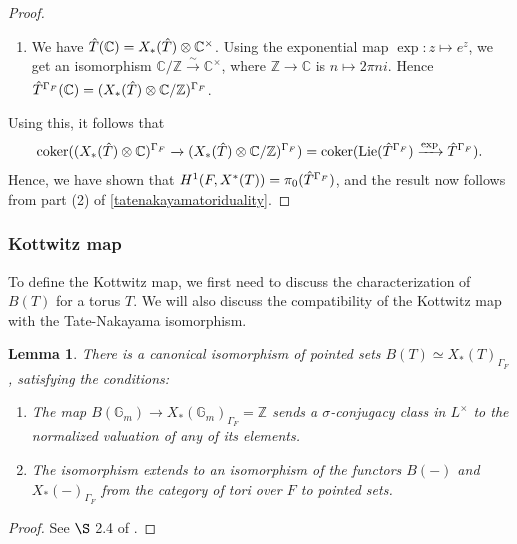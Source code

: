 \documentclass[11pt,a4paper]{article}
\theoremstyle{definition}
\theoremstyle{plain}
\newtheorem{Le}[shared]{Lemma}
\theoremstyle{remark}
\theoremstyle{plain}
\DeclareMathOperator{\Lie}{Lie}
\DeclareMathOperator{\coker}{coker}
\begin{document}
\begin{proof}
\begin{enumerate}
    \item We have $\Hat{T}(\mathbb{C}) = X_*(\Hat{T}) \otimes \mathbb{C}^{\times}$. Using the exponential map $\exp: z \mapsto e^z$, we get an isomorphism $\mathbb{C}/\mathbb{Z} \xrightarrow[]{\sim} \mathbb{C}^{\times}$, where $\mathbb{Z} \xrightarrow[]{} \mathbb{C}$ is $n \mapsto 2\pi ni$. Hence $\Hat{T}^{\Gamma_F}(\mathbb{C}) = (X_*(\Hat{T}) \otimes \mathbb{C}/\mathbb{Z})^{\Gamma_F}$.
\end{enumerate}
Using this, it follows that
$$\coker ((X_*(\Hat{T}) \otimes \mathbb{C})^{\Gamma_F} \xrightarrow[]{} (X_*(\Hat{T}) \otimes \mathbb{C}/\mathbb{Z})^{\Gamma_F}) = \coker (\Lie(\Hat{T}^{\Gamma_F}) \xrightarrow[]{\exp} \Hat{T}^{\Gamma_F}).$$
Hence, we have shown that $H^1(F, X^*(T)) = \pi_0(\Hat{T}^{\Gamma_F})$, and the result now follows from part (2) of \ref{tatenakayamatoriduality}.
\end{proof}

\subsubsection{Kottwitz map}
To define the Kottwitz map, we first need to discuss the characterization of $B(T)$ for a torus $T$. We will also discuss the compatibility of the Kottwitz map with the Tate-Nakayama isomorphism.

\begin{Le}\label{isocrystalsfortori}
    There is a canonical isomorphism of pointed sets $B(T) \simeq X_*(T)_{\Gamma_F}$, satisfying the conditions:
    \begin{enumerate}
        \item The map $B(\mathbb{G}_m) \xrightarrow[]{} X_*(\mathbb{G}_m)_{\Gamma_F} = \mathbb{Z}$ sends a $\sigma$-conjugacy class in $L^{\times}$ to the normalized valuation of any of its elements.
        \item The isomorphism extends to an isomorphism of the functors $B(-)$ and $X_*(-)_{\Gamma_F}$ from the category of tori over $F$ to pointed sets.
    \end{enumerate}  
\end{Le}
\begin{proof}
    See $\S$ 2.4 of \cite{MR809866}.
\end{proof}
\end{document}

